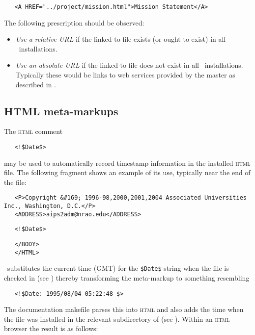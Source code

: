 \begin{verbatim}
   <A HREF="../project/mission.html">Mission Statement</A>
\end{verbatim}

\noindent
The following prescription should be observed:

\begin{itemize}
\item
   {\em Use a relative URL} if the linked-to file exists (or ought to exist)
   in all \aipspp\ installations.

\item
   {\em Use an absolute URL} if the linked-to file does not exist in all
   \aipspp\ installations.  Typically these would be links to web services
   provided by the master as described in .
\end{itemize}

\subsection*{HTML meta-markups}

The \textsc{html} comment

\noindent
\verb+   <!$+\verb+Date$>+

\noindent
may be used to automatically record timestamp information in the installed
\textsc{html} file.  The following fragment shows an example of its use,
typically near the end of the file:

\begin{verbatim}
   <P>Copyright &#169; 1996-98,2000,2001,2004 Associated Universities Inc., Washington, D.C.</P>
   <ADDRESS>aips2adm@nrao.edu</ADDRESS>
\end{verbatim}

\noindent
\verb+   <!$+\verb+Date$>+

\begin{verbatim}
   </BODY>
   </HTML>
\end{verbatim}

\noindent
\rcs\ substitutes the current time (GMT) for the \verb+$+\verb+Date$+ string
when the file is checked in (see ) thereby transforming the
meta-markup to something resembling

\noindent
\verb+   <!$+\verb+Date: 1995/08/04 05:22:48 $>+

\noindent
The documentation makefile parses this into \textsc{html} and also adds the
time when the  file was installed in the relevant subdirectory of
 (see ).  Within an \textsc{html} browser the
result is as follows:

